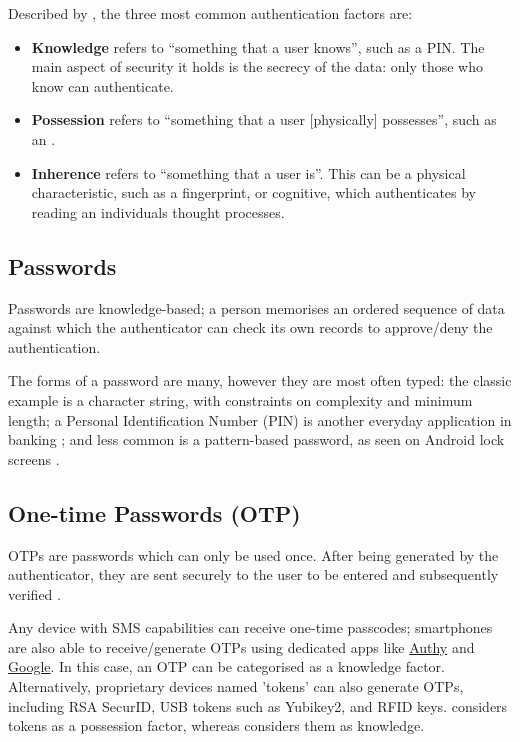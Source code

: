 Described by \cite{surveyOnAuthFactors}, the three most
common authentication factors are: 

\begin{itemize} 

  \item \textbf{Knowledge} \label{p:knowledge} refers to
        \enquote{something that a user knows}, such as a PIN.
        The main aspect of security it holds is the secrecy of the
        data: only those who know can authenticate.

  \item \textbf{Possession} refers to \enquote{something
          that a user [physically] possesses}, such as an
        .

  \item \textbf{Inherence} refers to \enquote{something
          that a user is}.
        This can be a physical characteristic, such as a
        fingerprint, or cognitive, which authenticates by reading
        an individuals thought processes.
\end{itemize}


\subsection{Passwords}
\label{p:passwords}
Passwords are knowledge-based; a person memorises an
ordered sequence of data against which the authenticator
can check its own records to approve/deny the
authentication.

The forms of a password are many, however they are most
often typed: the classic example is a character string,
with  constraints on complexity and minimum length; a
Personal Identification Number (PIN) is another everyday
application in banking \parencite{whatIsAuth}; and less
common is a pattern-based password, as seen on Android lock
screens \parencite{androidLockScreen}.

\subsection{One-time Passwords (OTP)}
\label{p:otp}
OTPs are passwords which can only be used once.
After being generated by the authenticator, they are sent
securely to the user to be entered and subsequently
verified \parencite{surveyOnAuthFactors}.

Any device with SMS capabilities can receive one-time
passcodes; smartphones are also able to receive/generate
OTPs using dedicated apps like
\href{https://www.twilio.com/authy/features/totp}{Authy}
and \href{https://play.google.com/store/apps/details?
  id=com.google.android.apps.authenticator2}{Google}.
In this case, an OTP can be categorised as a knowledge
factor\parencite{surveyOnAuthFactors, evalOfAuthMethods}.
Alternatively, proprietary devices named 'tokens' can also
generate OTPs, including RSA SecurID, USB tokens such as
Yubikey2, and RFID keys.
\cite{evalOfAuthMethods} considers tokens
as a possession factor, whereas
\cite{surveyOnAuthFactors} considers them as
knowledge.

